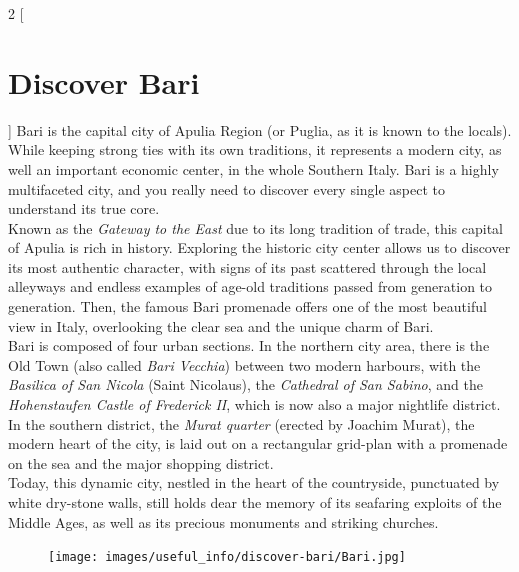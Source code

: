 \documentclass[
	openany, %
	parskip=full, %
	12pt, %
	a4paper, %
]{conferencebooklet} %
\begin{document}
\newpage
\begin{multicols}{2}
[\section{Discover Bari}]
Bari is the capital city of Apulia Region (or Puglia, as it is known to the locals). While keeping strong ties with its own traditions, it represents a modern city, as well an important economic center, in the whole Southern Italy. Bari is a highly multifaceted city, and you really need to discover every single aspect to understand its true core. \\
Known as the \textit{Gateway to the East} due to its long tradition of trade, this capital of Apulia is rich in history. Exploring the historic city center allows us to discover its most authentic character, with signs of its past scattered through the local alleyways and endless examples of age-old traditions passed from generation to generation. Then, the famous Bari promenade offers one of the most beautiful view in Italy, overlooking the clear sea and the unique charm of Bari. \\
Bari is composed of four urban sections. In the northern city area, there is the Old Town (also called \textit{Bari Vecchia}) between two modern harbours, with the \textit{Basilica of San Nicola} (Saint Nicolaus), the \textit{Cathedral of San Sabino}, and the \textit{Hohenstaufen Castle of Frederick II}, which is now also a major nightlife district. In the southern district, the \textit{Murat quarter} (erected by Joachim Murat), the modern heart of the city, is laid out on a rectangular grid-plan with a promenade on the sea and the major shopping district. \\
Today, this dynamic city, nestled in the heart of the countryside, punctuated by white dry-stone walls, still holds dear the memory of its seafaring exploits of the Middle Ages, as well as its precious monuments and striking churches.

\end{multicols}
\begin{figure}[h!]
    \centering
    \texttt{[image: images/useful\_info/discover-bari/Bari.jpg]}
\end{figure}


\end{document}

